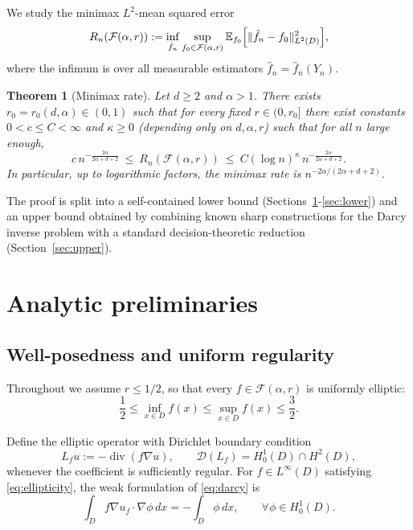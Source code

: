 \documentclass[11pt]{article}
\newtheorem{theorem}{Theorem}
\theoremstyle{definition}
\theoremstyle{remark}
\DeclareMathOperator{\diver}{div}
\newcommand{\1}{\mathbf{1}}
\newcommand{\E}{\mathbb{E}}
\begin{document}
We study the minimax $L^2$-mean squared error
\[
R_n(\mathcal F(\alpha,r))
:=\inf_{\hat f_n}\sup_{f_0\in\mathcal F(\alpha,r)}\E_{f_0}\Bigl[\|\hat f_n-f_0\|_{L^2(D)}^2\Bigr],
\]
where the infimum is over all measurable estimators $\hat f_n=\hat f_n(Y_n)$.

\begin{theorem}[Minimax rate]\label{thm:main}
Let $d\ge2$ and $\alpha>1$. There exists $r_0=r_0(d,\alpha)\in(0,1)$ such that for every fixed $r\in(0,r_0]$ there exist constants $0<c\le C<\infty$ and $\kappa\ge0$ (depending only on $d,\alpha,r$) such that for all $n$ large enough,
\[
c\,n^{-\frac{2\alpha}{2\alpha+d+2}}
\ \le\
R_n(\mathcal F(\alpha,r))
\ \le\
C(\log n)^\kappa\,n^{-\frac{2\alpha}{2\alpha+d+2}}.
\]
In particular, up to logarithmic factors, the minimax rate is $n^{-2\alpha/(2\alpha+d+2)}$.
\end{theorem}

The proof is split into a self-contained lower bound (Sections~\ref{sec:analytic}-\ref{sec:lower}) and an upper bound obtained by combining known sharp constructions for the Darcy inverse problem with a standard decision-theoretic reduction (Section~\ref{sec:upper}).

\section{Analytic preliminaries}\label{sec:analytic}

\subsection{Well-posedness and uniform regularity}

Throughout we assume $r\le1/2$, so that every $f\in\mathcal F(\alpha,r)$ is uniformly elliptic:
\begin{equation}\label{eq:ellipticity}
\frac12\le \inf_{x\in D}f(x)\le \sup_{x\in D}f(x)\le \frac32.
\end{equation}

Define the elliptic operator with Dirichlet boundary condition
\[
L_f u := -\diver(f\nabla u),\qquad \mathcal D(L_f)=H_0^1(D)\cap H^2(D),
\]
whenever the coefficient is sufficiently regular. For $f\in L^\infty(D)$ satisfying \eqref{eq:ellipticity}, the weak formulation of \eqref{eq:darcy} is
\begin{equation}\label{eq:weak}
\int_D f\nabla u_f\cdot\nabla\phi\,dx = -\int_D \phi\,dx,\qquad \forall \phi\in H_0^1(D).
\end{equation}
\end{document}
